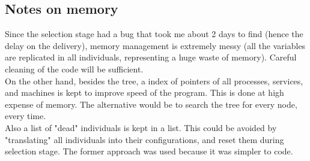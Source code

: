 \documentclass[a4paper,10pt]{article}
\begin{document}
\subsection{Notes on memory}
Since the selection stage had a bug that took me about 2 days to find (hence the delay on the delivery), memory management is extremely messy (all the variables are replicated in all individuals, representing a huge waste of memory). Careful cleaning of the code will be sufficient. \\
On the other hand, besides the tree, a index of pointers of all processes, services, and machines is kept to improve speed of the program. This is done at high expense of memory. The alternative would be to search the tree for every node, every time. \\
Also a list of "dead" individuals is kept in a list. This could be avoided by "translating" all individuals into their configurations, and reset them during selection stage. The former approach was used because it was simpler to code. 
\end{document}
